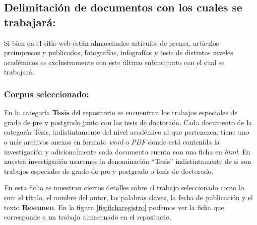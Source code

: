 \documentclass[
  10,
  openany]{book}
\begin{document}
\hypertarget{delimitaciuxf3n-de-documentos-con-los-cuales-se-trabajaruxe1}{%
\subsection{Delimitación de documentos con los cuales se trabajará:}\label{delimitaciuxf3n-de-documentos-con-los-cuales-se-trabajaruxe1}}

Si bien en el sitio web están almacenados artículos de prensa, artículos preimpresos y publicados, fotografías, infografías y tesis de distintos niveles académicos es exclusivamente con este último subconjunto con el cual se trabajará.

\hypertarget{corpus}{%
\subsubsection{Corpus seleccionado:}\label{corpus}}

En la categoría \textbf{Tesis} del repositorio se encuentran los trabajos especiales de grado de pre y postgrado junto con las tesis de doctorado. Cada documento de la categoría Tesis, indistintamente del nivel académico al que pertenezca, tiene uno o más archivos anexos en formato \emph{word} o \emph{PDF} donde está contenida la investigación y adicionalmente cada documento cuenta con una ficha en \emph{html}. En nuestra investigación usaremos la denominación ``Tesis'' indistintamente de si son trabajos especiales de grado de pre y postgrado o tesis de doctorado.

En esta ficha se muestran ciertos detalles sobre el trabajo seleccionado como lo son: el título, el nombre del autor, las palabras claves, la fecha de publicación y el texto \textbf{Resumen}. En la figura \ref{fig:ficharegistro} podemos ver la ficha que corresponde a un trabajo almacenado en el repositorio.
\end{document}
